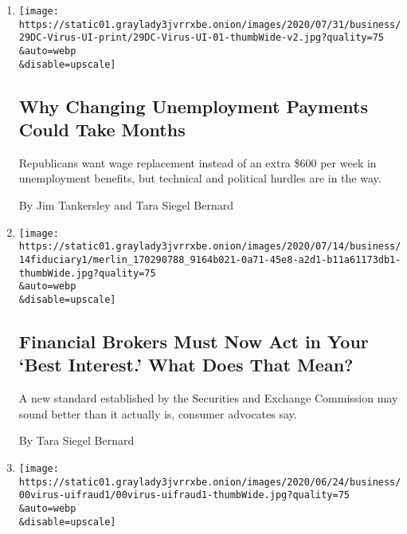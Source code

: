 \begin{enumerate}
\def\labelenumi{\arabic{enumi}.}
\item
  \href{/2020/07/30/business/unemployment-payments-change.html}{}

  \texttt{[image: https://static01.graylady3jvrrxbe.onion/images/2020/07/31/business/29DC-Virus-UI-print/29DC-Virus-UI-01-thumbWide-v2.jpg?quality=75\\\&auto=webp\\\&disable=upscale]}

  \hypertarget{why-changing-unemployment-payments-could-take-months}{%
  \subsection{Why Changing Unemployment Payments Could Take
  Months}\label{why-changing-unemployment-payments-could-take-months}}

  Republicans want wage replacement instead of an extra \$600 per week
  in unemployment benefits, but technical and political hurdles are in
  the way.

  By Jim Tankersley and Tara Siegel Bernard
\item
  \href{/2020/07/16/your-money/fiduciary-duty-investments-best-interest.html}{}

  \texttt{[image: https://static01.graylady3jvrrxbe.onion/images/2020/07/14/business/14fiduciary1/merlin\_170290788\_9164b021-0a71-45e8-a2d1-b11a61173db1-thumbWide.jpg?quality=75\\\&auto=webp\\\&disable=upscale]}

  \hypertarget{financial-brokers-must-now-act-in-your-best-interest-what-does-that-mean}{%
  \subsection{Financial Brokers Must Now Act in Your `Best Interest.'
  What Does That
  Mean?}\label{financial-brokers-must-now-act-in-your-best-interest-what-does-that-mean}}

  A new standard established by the Securities and Exchange Commission
  may sound better than it actually is, consumer advocates say.

  By Tara Siegel Bernard
\item
  \href{/2020/07/02/your-money/coronavirus-unemployment-fraud.html}{}

  \texttt{[image: https://static01.graylady3jvrrxbe.onion/images/2020/06/24/business/00virus-uifraud1/00virus-uifraud1-thumbWide.jpg?quality=75\\\&auto=webp\\\&disable=upscale]}

  \hypertarget{fraudulent-jobless-claims-slow-relief-to-the-truly-desperate}{%
}
\end{enumerate}
